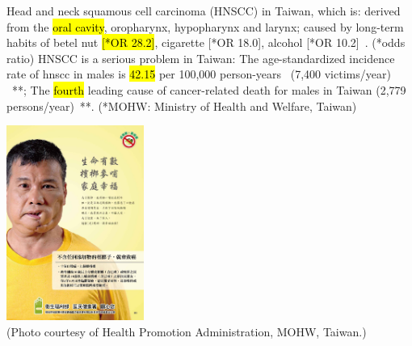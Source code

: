 \documentclass[
paper=landscape,
paper=160mm:90mm, %
fontsize=11pt, %
pagesize, %
parskip=half-, %
]{scrartcl} %
\theoremstyle{mythmstyle} %
\begin{document}
\begin{minipage}[c]{0.60\linewidth}
\begin{outline}
    \1 Head and neck squamous cell carcinoma (HNSCC) in Taiwan, which is:
        \2 derived from the \hl{oral cavity}, oropharynx, hypopharynx and larynx;
        \2 caused by long-term habits of betel nut \hl{[*OR 28.2]}, cigarette [*OR 18.0], alcohol [*OR 10.2]~\autocite{Ko1995}. {\tiny (*odds ratio)}
    \1  HNSCC is a serious problem in Taiwan:
        \2 The age-standardized incidence rate of \acrshort{hnscc} in males is \hl{42.15} per 100,000 person-years~ (7,400 victims/year) ~\autocite{MOHWincidence2018}**;
        \2 The \hl{fourth} leading cause of cancer-related death for males in Taiwan (2,779 persons/year)~\autocite{MOHWdeath2017}**.
        {\tiny (*MOHW: Ministry of Health and Welfare, Taiwan)}
\end{outline}
\end{minipage}%
\begin{minipage}[c]{0.35\linewidth}
    \raggedright
    \hfill
    \includegraphics[width=4.5cm]{20369933_1755313531164078_5705495585669958017_o.jpg}\\
   \tiny (Photo courtesy of Health Promotion Administration, MOHW, Taiwan.)

\end{minipage}




\clearpage

\thispagestyle{headings}
\end{document}
